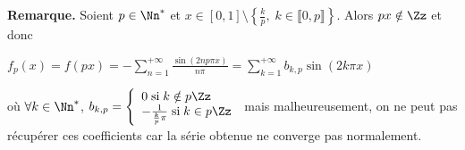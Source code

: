 {{\textbf{Remarque.} Soient $p\in\Nn^*$ et $x\in[0,1]\setminus\left\{
\frac{k}{p},\;k\in\llbracket0,p\rrbracket\right\}$. Alors $px\notin\Zz$ et donc

\begin{center}
$f_p(x)=f(px)=-\sum_{n=1}^{+\infty}\frac{\sin(2np\pi x)}{n\pi}=\sum_{k=1}^{+\infty}b_{k,p}\sin(2k\pi x)$
\end{center}

où $\forall k\in\Nn^*$, $b_{k,p}=\left\{
\begin{array}{l}
0\;\text{si}\;k\notin p\Zz\\
-\frac{1}{\frac{k}{p}\pi}\;\text{si}\;k\in p\Zz
\end{array}
\right.$ mais malheureusement, on ne peut pas récupérer ces coefficients car la série obtenue ne converge pas normalement.

\begin{center}
\end{center}
}
}
